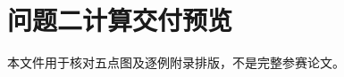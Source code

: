 \documentclass[UTF8,a4paper,12pt]{ctexart}
\begin{document}
\section*{问题二计算交付预览}
本文件用于核对五点图及逐例附录排版，不是完整参赛论文。

\clearpage

\end{document}
